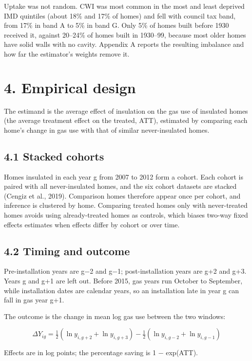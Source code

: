 \documentclass[11pt,a4paper]{article}
\begin{document}
Uptake was not random. CWI was most common in the most and least deprived IMD quintiles (about 18\% and 17\% of homes) and fell with council tax band, from 17\% in band A to 5\% in band G. Only 5\% of homes built before 1930 received it, against 20--24\% of homes built in 1930--99, because most older homes have solid walls with no cavity. Appendix A reports the resulting imbalance and how far the estimator's weights remove it.

\section*{4. Empirical design}

The estimand is the average effect of insulation on the gas use of insulated homes (the average treatment effect on the treated, ATT), estimated by comparing each home's change in gas use with that of similar never-insulated homes.

\subsection*{4.1 Stacked cohorts}

Homes insulated in each year g from 2007 to 2012 form a cohort. Each cohort is paired with all never-insulated homes, and the six cohort datasets are stacked (Cengiz et al., 2019). Comparison homes therefore appear once per cohort, and inference is clustered by home. Comparing treated homes only with never-treated homes avoids using already-treated homes as controls, which biases two-way fixed effects estimates when effects differ by cohort or over time.

\subsection*{4.2 Timing and outcome}

Pre-installation years are g−2 and g−1; post-installation years are g+2 and g+3. Years g and g+1 are left out. Before 2015, gas years run October to September, while installation dates are calendar years, so an installation late in year g can fall in gas year g+1.

The outcome is the change in mean log gas use between the two windows:

\[
\Delta Y_{ig} = \tfrac{1}{2}\left(\ln y_{i,g+2} + \ln y_{i,g+3}\right) - \tfrac{1}{2}\left(\ln y_{i,g-2} + \ln y_{i,g-1}\right)
\]

Effects are in log points; the percentage saving is 1 − exp(ATT).
\end{document}
